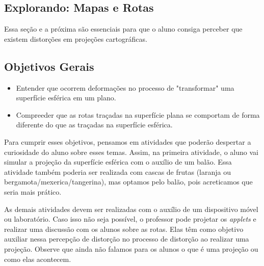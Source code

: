 \cleardoublepage

\def\currentcolor{session1}
\begin{texto}{
\section{Explorando: Mapas e Rotas}

Essa seção e a próxima são essenciais para que o aluno consiga perceber que existem distorções em projeções cartográficas.

\subsection{Objetivos Gerais}

\begin{itemize}
\item Entender que ocorrem deformações no processo de "transformar" uma superfície esférica em um plano.

\item Compreeder que as rotas traçadas na superfície plana se comportam de forma diferente do que as traçadas na superfície esférica.
\end{itemize}

Para cumprir esses objetivos, pensamos em atividades que poderão despertar a curiosidade do aluno sobre esses temas. Assim, na primeira atividade, o aluno vai simular a projeção da superfície esférica com o auxílio de um balão. Essa atividade também poderia ser realizada com cascas de frutas (laranja ou bergamota/mexerica/tangerina), mas optamos pelo balão, pois acreticamos que seria mais prático.

As demais atividades devem ser realizadas com o auxílio de um dispositivo móvel ou laboratório. Caso isso não seja possível, o professor pode projetar os \textit{applets} e realizar uma discussão com os alunos sobre as rotas. Elas têm como objetivo auxiliar nessa percepção de distorção no processo de distorção ao realizar uma projeção. Observe que ainda não falamos para os alunos o que é uma projeção ou como elas acontecem.
}
\end{texto}

